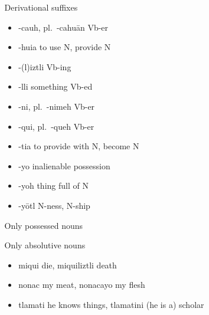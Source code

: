 \documentclass[12pt]{beamer}
\newcommand{\nah}[1]{\textcolor{nahgrn}{#1}}
\newcommand{\trs}[1]{\textcolor{nahblu}{#1}}
\begin{document}
\begin{frame}
\begin{columns}[t]
\begin{column}{.25\linewidth}
    \end{column}
    \begin{column}{.22\linewidth}
      \begin{block}{Derivational suffixes}
        \begin{threeparttable}
          \vspace{-1.5ex}
          \begin{multicols}{2}
            \begin{itemize}
            \item \nah{-cauh}, pl.~\nah{-cahuān}  \trs{Vb-er}
            \item \nah{-huia} \trs{to use N, provide N}
            \item \nah{-(l)iztli} \trs{Vb-ing}
            \item \nah{-lli} \trs{something Vb-ed}
            \item \nah{-ni}, pl.~\nah{-nimeh}  \trs{Vb-er}
            \item \nah{-qui}, pl.~\nah{-queh}  \trs{Vb-er}
            \item \nah{-tia} \trs{to provide with N, become N}       
            \item \nah{-yo} inalienable possession
            \item \nah{-yoh} \trs{thing full of N}
            \item \nah{-yōtl} \trs{N-ness, N-ship}
            \end{itemize}
          \end{multicols}
          \begin{tablenotes}
          \item[1] Only possessed nouns
          \item[2] Only absolutive nouns
          \end{tablenotes}
        \end{threeparttable}
      \end{block}
      \begin{example}
        \vspace{-1.5ex}
        \begin{multicols}{2}
          \begin{itemize}
          \item \nah{miqui} \trs{die}, \nah{miquiliztli} \trs{death}
          \item \nah{nonac} \trs{my meat}, \nah{nonacayo} \trs{my flesh}
          \item \nah{tlamati} \trs{he knows things}, \nah{tlamatini} \trs{(he is a) scholar}

\end{itemize}
\end{multicols}
\end{example}
\end{column}
\end{columns}
\end{frame}
\end{document}
